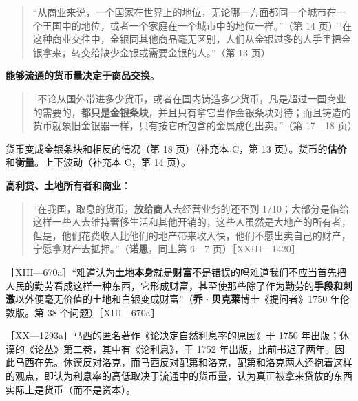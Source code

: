 \begin{quote}“从商业来说，一个国家在世界上的地位，无论哪一方面都同一个城市在一个王国中的地位，或者一个家庭在一个城市中的地位一样。”（第 14 页）“在这种商业交往中，金银同其他商品毫无区别，人们从金银过多的人手里把金银拿来，转交给缺少金银或需要金银的人。”（第 13 页）\end{quote}

\textbf{能够流通的货币量决定于商品交换}。

\begin{quote}“不论从国外带进多少货币，或者在国内铸造多少货币，凡是超过一国商业的需要的，\textbf{都只是金银条块}，并且只有拿它当作金银条块对待；而且铸造的货币就象旧金银器一样，只有按它所包含的金属成色出卖。”（第 17—18 页）\end{quote}

货币变成金银条块和相反的情况（第 18 页）（补充本 C，第 13 页）。货币的\textbf{估价}和\textbf{衡量}。上下波动（补充本 C，第 14 页）。

\textbf{高利贷、土地所有者和商业}：

\begin{quote}“在我国，取息的货币，\textbf{放给商人}去经营业务的还不到 1/10；大部分是借给这样一些人去维持奢侈生活和其他开销的，这些人虽然是大地产的所有者，但是，他们花费收入比他们的地产带来收入快，他们不愿出卖自己的财产，宁愿拿财产去抵押。”（\textbf{诺思}，同上第 6—7 页）［XXIII—1420］\end{quote}


［XIII—670a］“难道认为\textbf{土地本身}就是\textbf{财富}不是错误的吗难道我们不应当首先把人民的勤劳看成这样一种东西，它形成财富，甚至使那些除了作为勤劳的\textbf{手段和刺激}以外便毫无价值的土地和白银变成财富”（\textbf{乔·贝克莱}博士《提问者》1750 年伦敦版。第 38 个问题）［XIII—670a］



［XX—1293a］马西的匿名著作《论决定自然利息率的原因》于 1750 年出版；休谟的《论丛》第二卷，其中有《论利息》，于 1752 年出版，比前书迟了两年。因此马西在先。休谟反对洛克，而马西反对配第和洛克，配第和洛克两人还抱着这样的观点，即认为利息率的高低取决于流通中的货币量，认为真正被拿来贷放的东西实际上是货币（而不是资本）。


